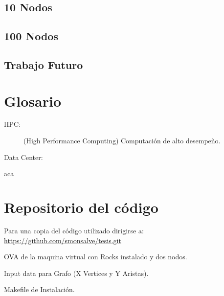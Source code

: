 \documentclass[twoside,letterpaper,12pt]{report}
\begin{document}
\section{10 Nodos}
\section{100 Nodos}

\section{Trabajo Futuro}

\chapter{Glosario}
\label{chapGlosario}

\begin{description}
	\item[HPC:] (High Performance Computing) Computación de alto desempeño.
	\item[Data Center:]
\end{description}

\newpage



	
aca
\cite{czarnecki2000generative}
\cite{wwwboost}
\cite{stroustrup2013c++}
\cite{andrei2001modern}
\cite{Wall2000}
\cite{Boost}
\cite{Karniadakis}
\cite{Kernighan1988}


\todo[inline,caption={TODO}]{
}

\newpage

\appendix
\chapter{Repositorio del código}

Para una copia del código utilizado dirigirse a: \url{https://github.com/smonsalve/tesis.git}

OVA de la maquina virtual con Rocks instalado y dos nodos.

Input data para Grafo (X Vertices y Y Aristas).

Makefile de Instalación.
\end{document}
